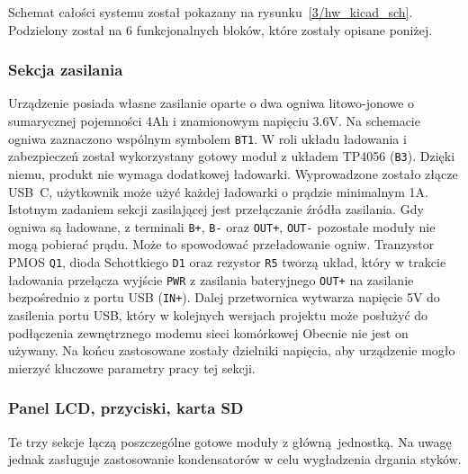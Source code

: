 \documentclass[12pt]{report}
\begin{document}
			Schemat całości systemu został pokazany na rysunku~\ref{3/hw_kicad_sch}. Podzielony został na 6 funkcjonalnych bloków, które zostały opisane poniżej.
			
			\subsubsection{Sekcja zasilania}
				Urządzenie posiada własne zasilanie oparte o dwa ogniwa litowo-jonowe o sumarycznej pojemności 4Ah i znamionowym napięciu 3.6V. Na schemacie ogniwa zaznaczono wspólnym symbolem \lstinline|BT1|. W roli układu ładowania i zabezpieczeń został wykorzystany gotowy moduł\textsuperscript{\cite{hw_mod_chg}} z układem TP4056 (\lstinline|B3|). Dzięki niemu, produkt nie wymaga dodatkowej ładowarki. Wyprowadzone zostało złącze USB~C, użytkownik może użyć każdej ładowarki o prądzie minimalnym 1A. Istotnym zadaniem sekcji zasilającej jest przełączanie źródła zasilania. Gdy ogniwa są ładowane, z terminali \lstinline|B+|, \lstinline|B-| oraz \lstinline|OUT+|, \lstinline|OUT-| pozostałe moduły nie mogą pobierać prądu. Może to spowodować przeładowanie ogniw. Tranzystor PMOS \lstinline|Q1|, dioda Schottkiego \lstinline|D1| oraz rezystor \lstinline|R5| tworzą układ\textsuperscript{\cite{hw_load_sw}}, który w trakcie ładowania przełącza  wyjście \lstinline|PWR| z zasilania bateryjnego \lstinline|OUT+| na zasilanie bezpośrednio z portu USB (\lstinline|IN+|). Dalej przetwornica wytwarza napięcie 5V do zasilenia portu USB, który w kolejnych wersjach projektu może posłużyć do podłączenia zewnętrznego modemu sieci komórkowej Obecnie nie jest on używany. Na końcu zastosowane zostały dzielniki napięcia, aby urządzenie mogło mierzyć kluczowe parametry pracy tej sekcji.
				
			\subsubsection{Panel LCD, przyciski, karta SD}
				Te trzy sekcje łączą poszczególne gotowe moduły z główną jednostką. Na uwagę jednak zasługuje zastosowanie kondensatorów w celu wygładzenia drgania styków.
				
\end{document}
